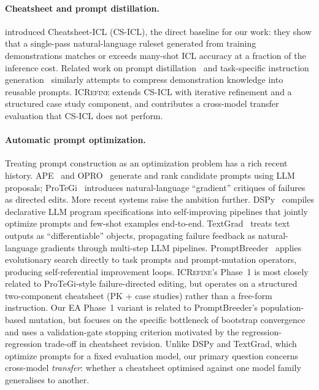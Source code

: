 \documentclass{article}
\begin{document}
\paragraph{Cheatsheet and prompt distillation.}
\citet{csicl2024} introduced Cheatsheet-ICL (CS-ICL), the direct baseline for our work:
they show that a single-pass natural-language ruleset generated from training demonstrations
matches or exceeds many-shot ICL accuracy at a fraction of the inference cost.
Related work on prompt distillation~\citep{li2023promptdistillation} and task-specific
instruction generation~\citep{ape2022,zhou2022large} similarly attempts to compress
demonstration knowledge into reusable prompts.
\textsc{ICRefine} extends CS-ICL with iterative refinement and a structured case study
component, and contributes a cross-model transfer evaluation that CS-ICL does not perform.

\paragraph{Automatic prompt optimization.}
Treating prompt construction as an optimization problem has a rich recent history.
APE~\citep{ape2022} and OPRO~\citep{opro2023} generate and rank candidate prompts using
LLM proposals; ProTeGi~\citep{pryzant2023protegi} introduces natural-language ``gradient''
critiques of failures as directed edits.
More recent systems raise the ambition further. DSPy~\citep{khattab2024dspy} compiles
declarative LLM program specifications into self-improving pipelines that jointly optimize
prompts and few-shot examples end-to-end.
TextGrad~\citep{yuksekgonul2024textgrad} treats text outputs as
``differentiable'' objects, propagating failure feedback as natural-language gradients through
multi-step LLM pipelines.
PromptBreeder~\citep{fernando2023promptbreeder} applies evolutionary search directly to
task prompts and prompt-mutation operators, producing self-referential improvement loops.
\textsc{ICRefine}'s Phase~1 is most closely related to ProTeGi-style failure-directed editing,
but operates on a structured two-component cheatsheet (PK + case studies) rather than a
free-form instruction.
Our EA Phase~1 variant is related to PromptBreeder's population-based mutation, but focuses
on the specific bottleneck of bootstrap convergence and uses a validation-gate stopping
criterion motivated by the regression-regression trade-off in cheatsheet revision.
Unlike DSPy and TextGrad, which optimize prompts for a fixed evaluation model, our primary
question concerns cross-model \emph{transfer}: whether a cheatsheet optimised against one
model family generalises to another.
\end{document}
